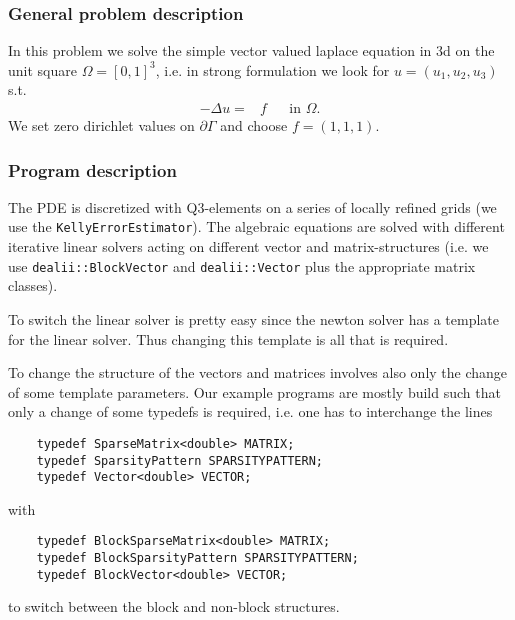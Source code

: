 \subsubsection{General problem description}
In this problem we solve the simple vector valued laplace equation in 3d
on the unit square $\Omega=[0,1]^3$, i.e. in strong formulation we look for $u=(u_1, u_2, u_3)$ s.t.
\begin{align*}
-\Delta u =& f &&\text{in }\Omega.
\end{align*}
We set zero dirichlet values on $\partial \Gamma$ and choose $f=(1,1,1)$.
\subsubsection{Program description}
The PDE is discretized with Q3-elements on a series of locally refined grids (we use the \texttt{KellyErrorEstimator}). The algebraic equations are solved with  different iterative linear solvers acting on different vector and matrix-structures (i.e. we use \texttt{dealii::BlockVector} and \texttt{dealii::Vector} plus the appropriate matrix classes). 

To switch the linear solver is pretty easy since the newton solver has a template for the linear solver. Thus changing this template is all that is required. 

To change the structure of the vectors and matrices involves also only the change of some template parameters. Our example programs are mostly build such that only a change of some typedefs is required, i.e. one has to interchange the lines
\begin{verbatim}
	typedef SparseMatrix<double> MATRIX;
	typedef SparsityPattern SPARSITYPATTERN;
	typedef Vector<double> VECTOR;
\end{verbatim}
with
\begin{verbatim}
	typedef BlockSparseMatrix<double> MATRIX;
	typedef BlockSparsityPattern SPARSITYPATTERN;
	typedef BlockVector<double> VECTOR;
\end{verbatim}
to switch between the block and non-block structures.

